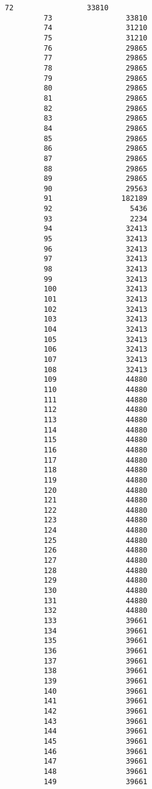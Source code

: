 \documentclass{article}
\begin{document}
\begin{Verbatim}[commandchars=\\\{\}]
         72                 33810  
         73                 33810  
         74                 31210  
         75                 31210  
         76                 29865  
         77                 29865  
         78                 29865  
         79                 29865  
         80                 29865  
         81                 29865  
         82                 29865  
         83                 29865  
         84                 29865  
         85                 29865  
         86                 29865  
         87                 29865  
         88                 29865  
         89                 29865  
         90                 29563  
         91                182189  
         92                  5436  
         93                  2234  
         94                 32413  
         95                 32413  
         96                 32413  
         97                 32413  
         98                 32413  
         99                 32413  
         100                32413  
         101                32413  
         102                32413  
         103                32413  
         104                32413  
         105                32413  
         106                32413  
         107                32413  
         108                32413  
         109                44880  
         110                44880  
         111                44880  
         112                44880  
         113                44880  
         114                44880  
         115                44880  
         116                44880  
         117                44880  
         118                44880  
         119                44880  
         120                44880  
         121                44880  
         122                44880  
         123                44880  
         124                44880  
         125                44880  
         126                44880  
         127                44880  
         128                44880  
         129                44880  
         130                44880  
         131                44880  
         132                44880  
         133                39661  
         134                39661  
         135                39661  
         136                39661  
         137                39661  
         138                39661  
         139                39661  
         140                39661  
         141                39661  
         142                39661  
         143                39661  
         144                39661  
         145                39661  
         146                39661  
         147                39661  
         148                39661  
         149                39661  
\end{Verbatim}
        
\end{document}
